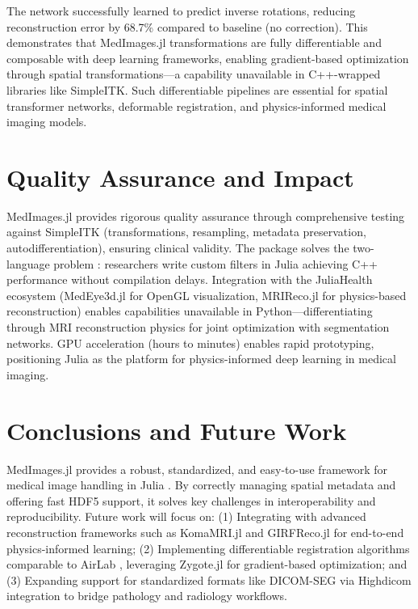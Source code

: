 \documentclass[a4paper,10pt]{elsarticle}
\begin{document}
  The network successfully learned to predict inverse rotations, reducing reconstruction error by 68.7\% compared to baseline (no correction). This demonstrates that MedImages.jl transformations are fully differentiable and composable
  with deep learning frameworks, enabling gradient-based optimization through spatial transformations—a capability unavailable in C++-wrapped libraries like SimpleITK. Such differentiable pipelines are essential for spatial transformer
  networks, deformable registration, and physics-informed medical imaging models.

  \section{Quality Assurance and Impact}

  MedImages.jl provides rigorous quality assurance through comprehensive testing against SimpleITK (transformations, resampling, metadata preservation, autodifferentiation), ensuring clinical validity. The package solves the two-language
  problem \cite{BezansonChen2018}: researchers write custom filters in Julia \cite{RoeschGreener2023} achieving C++ performance without compilation delays. Integration with the JuliaHealth ecosystem (MedEye3d.jl for OpenGL visualization, MRIReco.jl \cite{KnoppGrosser2021} for physics-based reconstruction)
  enables capabilities unavailable in Python—differentiating through MRI reconstruction physics for joint optimization with segmentation networks. GPU acceleration (hours to minutes) enables rapid prototyping, positioning Julia as the
  platform for physics-informed deep learning in medical imaging.

  \section{Conclusions and Future Work}

  MedImages.jl provides a robust, standardized, and easy-to-use framework for medical image handling in Julia \cite{PalBhattacharya2024}. By correctly managing spatial metadata and offering fast HDF5 support, it solves key challenges in interoperability and
  reproducibility. Future work will focus on: (1) Integrating with advanced reconstruction frameworks such as KomaMRI.jl \cite{CastilloPassiCoronado2023} and GIRFReco.jl \cite{JaffrayWu2024} for end-to-end physics-informed learning; (2) Implementing differentiable registration algorithms comparable to AirLab \cite{SandkhlerJud2018}, leveraging Zygote.jl for gradient-based optimization; and (3) Expanding support for standardized formats like DICOM-SEG via Highdicom \cite{BridgeGorman2022} integration to bridge pathology and radiology workflows.
\end{document}
